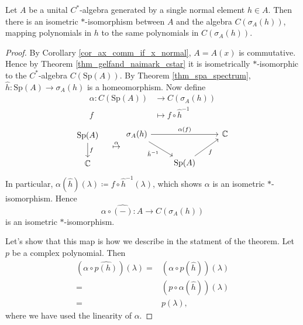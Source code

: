 \documentclass[12pt]{article}
\begin{document}
\begin{theorem}
	Let $A$ be a unital $C^\ast$-algebra generated by a single normal element $h\in A$. Then there is an isometric $\ast$-isomorphism between $A$ and the algebra $C(\sigma_A(h))$, mapping polynomials in $h$ to the same polynomials in $C(\sigma_A(h))$.
\end{theorem}
\begin{proof}
	By Corollary \ref{cor_ax_comm_if_x_normal}, $A=A(x)$ is commutative. Hence by Theorem \ref{thm_gelfand_naimark_cstar} it is isometrically $\ast$-isomorphic to the $C^\ast$-algebra $C(\text{Sp}(A))$. By Theorem \ref{thm_spa_spectrum}, $\hat{h}:\text{Sp}(A)\to\sigma_A(h)$ is a homeomorphism. Now define
	\begin{align*}
		\alpha: C(\text{Sp}(A)) &\longrightarrow C(\sigma_A(h)) \\
		f &\mapsto f \circ \hat{h}^{-1}
	\end{align*}
	\[
		\begin{tikzcd}
			\text{Sp}(A) \arrow[d, "f"] \\
			\mathbb{C}                 
		\end{tikzcd}
		\quad \overset{\alpha}{\mapsto}
		\begin{tikzcd}
				\sigma_A(h) \arrow[rd, "\hat{h}^{-1}"'] \arrow[rr, "\alpha(f)"] &                               & \mathbb{C} \\
																				& \text{Sp}(A) \arrow[ru, "f"'] &           
		\end{tikzcd}
	\]
	In particular, $\alpha(\hat{h})(\lambda)\coloneqq f\circ\hat{h}^{-1}(\lambda)$, which shows  $\alpha$ is an isometric $\ast$-isomorphism. Hence 
	\begin{equation*}
		\alpha\circ\widehat{(-)}:A\longrightarrow C(\sigma_A(h))
	\end{equation*}
	is an isometric $\ast$-isomorphism.

	Let's show that this map is how we describe in the statment of the theorem. Let $p$ be a complex polynomial. Then 
	\begin{align*}
		(\alpha\circ\widehat{p(h)})(\lambda) 
		=& (\alpha\circ p(\hat{h}))(\lambda) \\
		=& (p\circ\alpha(\hat{h}))(\lambda) \\
		=& p(\lambda),
	\end{align*}
	where we have used the linearity of $\alpha$.
\end{proof}
\end{document}
